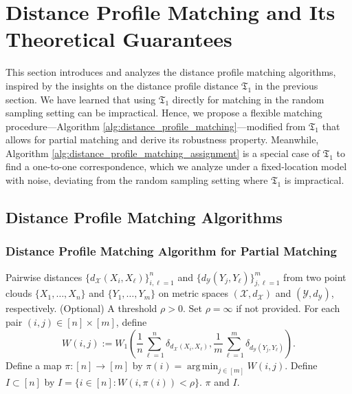 \documentclass[11pt,letterpaper]{article}
\theoremstyle{definition}
\numberwithin{equation}{section}
\newcommand{\cX}{\mathcal{X}}
\newcommand{\cY}{\mathcal{Y}}
\DeclareMathOperator*{\argmin}{arg\,min} %
\begin{document}
\section{Distance Profile Matching and Its Theoretical Guarantees}
\label{sec:main}
This section introduces and analyzes the distance profile matching algorithms, inspired by the insights on the distance profile distance $\mathfrak{T}_1$ in the previous section. We have learned that using $\mathfrak{T}_1$ directly for matching in the random sampling setting can be impractical. Hence, we propose a flexible matching procedure---Algorithm \ref{alg:distance_profile_matching}---modified from $\mathfrak{T}_1$ that allows for partial matching and derive its robustness property. Meanwhile, Algorithm \ref{alg:distance_profile_matching_assignment} is a special case of $\mathfrak{T}_1$ to find a one-to-one correspondence, which we analyze under a fixed-location model with noise, deviating from the random sampling setting where $\mathfrak{T}_1$ is impractical. 


\subsection{Distance Profile Matching Algorithms}


\subsubsection{Distance Profile Matching Algorithm for Partial Matching}
\label{sec:distance_profile_matching}

\begin{algorithm}[!b]
    \caption{Distance Profile Matching}
    \label{alg:distance_profile_matching}
    \begin{algorithmic}[1]
    \REQUIRE Pairwise distances $\{d_\cX(X_i, X_\ell)\}_{i, \ell = 1}^{n}$ and $\{d_\cY(Y_j, Y_\ell)\}_{j, \ell = 1}^{m}$ from two point clouds $\{X_1, \ldots, X_n\}$ and $\{Y_1, \ldots, Y_m\}$ on metric spaces $(\cX, d_\cX)$ and $(\cY, d_\cY)$, respectively.
    \REQUIRE (Optional) A threshold $\rho > 0$. Set $\rho = \infty$ if not provided.
    \STATE For each pair $(i, j) \in [n] \times [m]$, define 
    \begin{equation}
        \label{eq:W(i, j)}
        W(i, j) := W_1\left(\frac{1}{n} \sum_{\ell = 1}^{n} \delta_{d_\cX(X_i, X_\ell)}, \frac{1}{m} \sum_{\ell = 1}^{m} \delta_{d_\cY(Y_j, Y_\ell)}\right).
    \end{equation}
    \STATE Define a map $\pi \colon [n] \to [m]$ by $\pi(i) = \argmin_{j \in [m]} W(i, j)$.
    \STATE Define $I \subset [n]$ by $I = \{i \in [n] : W(i, \pi(i)) < \rho\}$.
    \RETURN $\pi$ and $I$.
\end{algorithmic}
\end{algorithm}
\end{document}
